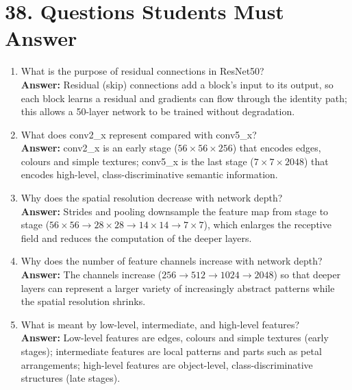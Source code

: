 \documentclass[10pt]{article}
\begin{document}
\section*{38. Questions Students Must Answer}

\begin{enumerate}

\item What is the purpose of residual connections in ResNet50?\\
\textbf{Answer:} Residual (skip) connections add a block's input to its output, so each block learns a residual and gradients can flow through the identity path; this allows a 50-layer network to be trained without degradation.

\item What does conv2\_x represent compared with conv5\_x?\\
\textbf{Answer:} conv2\_x is an early stage ($56\times56\times256$) that encodes edges, colours and simple textures; conv5\_x is the last stage ($7\times7\times2048$) that encodes high-level, class-discriminative semantic information.

\item Why does the spatial resolution decrease with network depth?\\
\textbf{Answer:} Strides and pooling downsample the feature map from stage to stage ($56\times56\rightarrow28\times28\rightarrow14\times14\rightarrow7\times7$), which enlarges the receptive field and reduces the computation of the deeper layers.

\item Why does the number of feature channels increase with network depth?\\
\textbf{Answer:} The channels increase ($256\rightarrow512\rightarrow1024\rightarrow2048$) so that deeper layers can represent a larger variety of increasingly abstract patterns while the spatial resolution shrinks.

\item What is meant by low-level, intermediate, and high-level features?\\
\textbf{Answer:} Low-level features are edges, colours and simple textures (early stages); intermediate features are local patterns and parts such as petal arrangements; high-level features are object-level, class-discriminative structures (late stages).


\end{enumerate}
\end{document}
